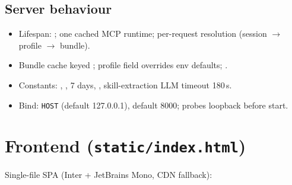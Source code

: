 \documentclass[11pt,a4paper]{article}
\newcommand{\file}[1]{\texttt{\small #1}}
\newcommand{\env}[1]{\texttt{\small #1}}
\begin{document}
\subsection{Server behaviour}
\begin{itemize}[leftmargin=2em]
  \item Lifespan: ; one cached MCP runtime;
        per-request  resolution (session $\rightarrow$ profile
        $\rightarrow$ bundle).
  \item Bundle cache keyed ; profile field
        overrides env defaults; .
  \item Constants: ,
        ,  7 days,
        , skill-extraction LLM timeout 180\,s.
  \item Bind: \env{HOST} (default 127.0.0.1),  default 8000;
         probes loopback before start.
\end{itemize}

\section{Frontend (\file{static/index.html})}
\label{sec:frontend}

Single-file SPA (Inter + JetBrains Mono, CDN fallback):
\end{document}
